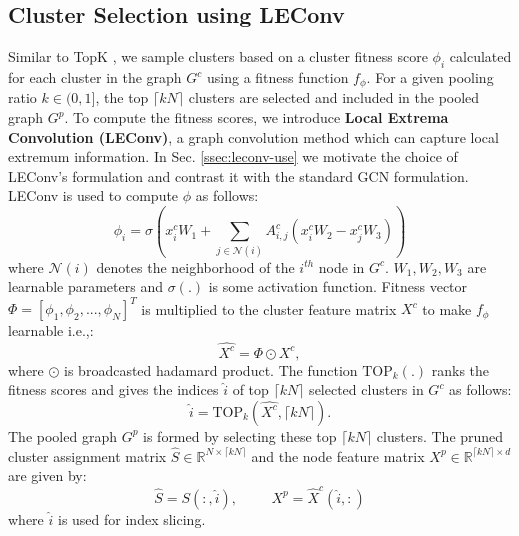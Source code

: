 \documentclass[letterpaper]{article} \usepackage{aaai20}  \usepackage{times}  \usepackage{helvet} \usepackage{courier}  \usepackage[hyphens]{url}  \usepackage{graphicx} \urlstyle{rm} \def\UrlFont{\rm}  \usepackage{graphicx}  \frenchspacing  \setlength{\pdfpagewidth}{8.5in}  \setlength{\pdfpageheight}{11in}
\begin{document}
\subsection{Cluster Selection using LEConv}
\label{ssec:cluster-selection}
Similar to TopK \cite{topk}, we sample clusters based on a cluster fitness score $\phi_{i}$ calculated for each cluster in the graph $G^c$ using a fitness function $f_{\phi}$. For a given pooling ratio $k \in (0, 1]$, the top $\lceil kN\rceil$ clusters are selected and included in the pooled graph $G^p$. To compute the fitness scores, we introduce \textbf{Local Extrema Convolution (LEConv)}, a graph convolution method which can capture local extremum information. In Sec. \ref{ssec:leconv-use} we motivate the choice of LEConv's formulation and contrast it with the standard GCN formulation. LEConv is used to compute $\phi$ as follows:
\begin{equation}
\label{eq:leconv}
    \phi_{i} = \sigma(x_{i}^c W_{1} + \sum_{j \in \mathcal{N}(i)} A_{i,j}^c (x_{i}^c W_{2} - x_{j}^c W_{3}))
\end{equation}
where $\mathcal{N}(i)$ denotes the neighborhood of the $i^{th}$ node in $G^c$. $W_{1}, W_{2}, W_{3}$ are learnable parameters and $\sigma(.)$ is some activation function. Fitness vector ${\Phi} = [\phi_{1}, \phi_{2},...,\phi_{N}]^{T}$ is multiplied to the cluster feature matrix $X^{c}$ to make $f_{\phi}$ learnable i.e.,:
\begin{equation}
    \nonumber
    \hat{X^{c}} = {\Phi} \odot X^{c},
\end{equation}
where $\odot$ is broadcasted hadamard product. The function $\text{TOP}_k(.)$ ranks the fitness scores and gives the indices $\hat{i}$ of top $\lceil kN \rceil$ selected clusters in $G^{c}$ as follows:
\begin{equation}
\nonumber
    \hat{i} = \text{TOP}_k(\hat{X^{c}}, \lceil kN \rceil).
\end{equation}
The pooled graph $G^p$ is formed by selecting these top $\lceil kN \rceil$ clusters. The pruned cluster assignment matrix $\hat{S} \in \mathbb{R}^{N \times \lceil kN \rceil}$ and the node feature matrix $X^{p} \in \mathbb{R}^{\lceil kN \rceil \times d}$ are given by:
\begin{equation}
\label{eq:x-pool}   
    \hat{S} = S(:, \hat{i}), \hspace{1cm} X^{p} = \hat{X}^{c}(\hat{i}, :)
\end{equation}
where $\hat{i}$ is used for index slicing.
\end{document}
